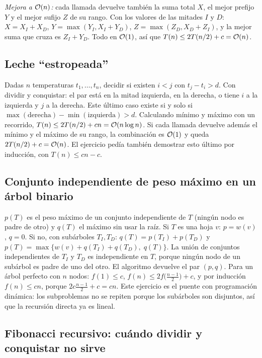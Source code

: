 \emph{Mejora a $\mathcal{O}(n)$:} cada llamada devuelve también la suma total $X$, el mejor prefijo $Y$ y el mejor sufijo $Z$ de su rango. Con los valores de las mitades $I$ y $D$: $X=X_I+X_D$, $Y=\max(Y_I,X_I+Y_D)$, $Z=\max(Z_D,X_D+Z_I)$, y la mejor suma que cruza es $Z_I+Y_D$. Todo en $\mathcal{O}(1)$, así que $T(n)\le 2T(n/2)+c=\mathcal{O}(n)$.

\subsection{Leche ``estropeada''}

Dadas $n$ temperaturas $t_1,\dots,t_n$, decidir si existen $i<j$ con $t_j-t_i>d$. Con dividir y conquistar: el par está en la mitad izquierda, en la derecha, o tiene $i$ a la izquierda y $j$ a la derecha. Este último caso existe si y solo si $\max(\text{derecha})-\min(\text{izquierda})>d$. Calculando mínimo y máximo con un recorrido, $T(n)\le 2T(n/2)+cn=\mathcal{O}(n\log n)$. Si cada llamada devuelve además el mínimo y el máximo de su rango, la combinación es $\mathcal{O}(1)$ y queda $2T(n/2)+c=\mathcal{O}(n)$. El ejercicio pedía también demostrar esto último por inducción, con $T(n)\le cn-c$.

\subsection{Conjunto independiente de peso máximo en un árbol binario}

$p(T)$ es el peso máximo de un conjunto independiente de $T$ (ningún nodo es padre de otro) y $q(T)$ el máximo sin usar la raíz. Si $T$ es una hoja $v$: $p=w(v)$, $q=0$. Si no, con subárboles $T_I,T_D$: $q(T)=p(T_I)+p(T_D)$ y $p(T)=\max\{w(v)+q(T_I)+q(T_D),\;q(T)\}$. La unión de conjuntos independientes de $T_I$ y $T_D$ es independiente en $T$, porque ningún nodo de un subárbol es padre de uno del otro. El algoritmo devuelve el par $(p,q)$. Para un árbol perfecto con $n$ nodos: $f(1)\le c$, $f(n)\le 2f\bigl(\frac{n-1}2\bigr)+c$, y por inducción $f(n)\le cn$, porque $2c\frac{n-1}{2}+c=cn$. Este ejercicio es el puente con programación dinámica: los subproblemas no se repiten porque los subárboles son disjuntos, así que la recursión directa ya es lineal.

\subsection{Fibonacci recursivo: cuándo dividir y conquistar no sirve}

